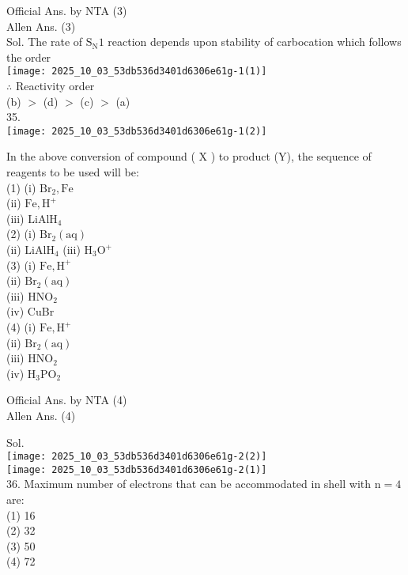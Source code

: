 \documentclass[10pt]{article}
\begin{document}
Official Ans. by NTA (3)\\
Allen Ans. (3)\\
Sol. The rate of \(\mathrm{S}_{\mathrm{N}} 1\) reaction depends upon stability of carbocation which follows the order\\
\texttt{[image: 2025\_10\_03\_53db536d3401d6306e61g-1(1)]}\\
\(\therefore\) Reactivity order\\
(b) \(>\) (d) \(>\) (c) \(>\) (a)\\
35.\\
\texttt{[image: 2025\_10\_03\_53db536d3401d6306e61g-1(2)]}

In the above conversion of compound ( X ) to product (Y), the sequence of reagents to be used will be:\\
(1) (i) \(\mathrm{Br}_{2}, \mathrm{Fe}\)\\
(ii) \(\mathrm{Fe}, \mathrm{H}^{+}\)\\
(iii) \(\mathrm{LiAlH}_{4}\)\\
(2) (i) \(\mathrm{Br}_{2}(\mathrm{aq})\)\\
(ii) \(\mathrm{LiAlH}_{4}\) (iii) \(\mathrm{H}_{3} \mathrm{O}^{+}\)\\
(3) (i) \(\mathrm{Fe}, \mathrm{H}^{+}\)\\
(ii) \(\mathrm{Br}_{2}(\mathrm{aq})\)\\
(iii) \(\mathrm{HNO}_{2}\)\\
(iv) CuBr\\
(4) (i) \(\mathrm{Fe}, \mathrm{H}^{+}\)\\
(ii) \(\mathrm{Br}_{2}(\mathrm{aq})\)\\
(iii) \(\mathrm{HNO}_{2}\)\\
(iv) \(\mathrm{H}_{3} \mathrm{PO}_{2}\)

Official Ans. by NTA (4)\\
Allen Ans. (4)

Sol.\\
\texttt{[image: 2025\_10\_03\_53db536d3401d6306e61g-2(2)]}\\
\texttt{[image: 2025\_10\_03\_53db536d3401d6306e61g-2(1)]}\\
36. Maximum number of electrons that can be accommodated in shell with \(\mathrm{n}=4\) are:\\
(1) 16\\
(2) 32\\
(3) 50\\
(4) 72
\end{document}
